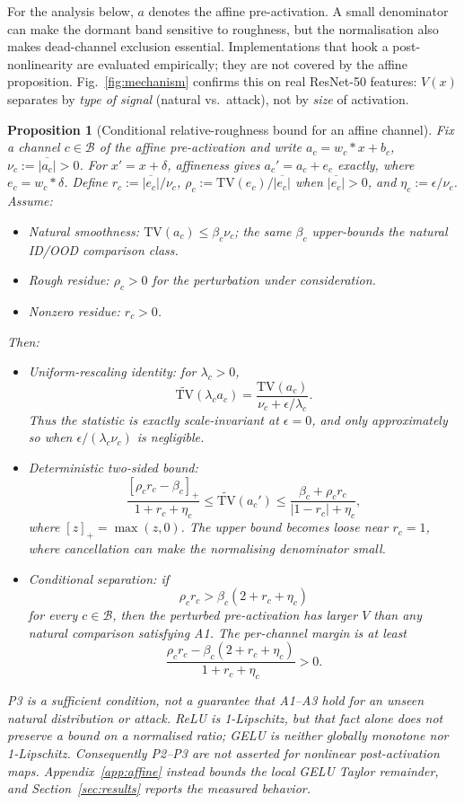 \documentclass[10pt,letterpaper,journal]{IEEEtran}
\newtheorem{proposition}{Proposition}
\newcommand{\rev}[1]{#1}
\begin{document}
For the analysis below, $a$ denotes the affine pre-activation. A small
denominator can make the dormant band sensitive to roughness, but the
normalisation also makes dead-channel exclusion essential. Implementations that
hook a post-nonlinearity are evaluated empirically; they are not covered by the
affine proposition.
\rev{Fig.~\ref{fig:mechanism} confirms this on real ResNet-50 features: $V(x)$
separates by \emph{type of signal} (natural vs.\ attack), not by \emph{size} of
activation.}

\begin{proposition}[Conditional relative-roughness bound for an affine channel]
\label{prop:shape}
Fix a channel $c\in\mathcal B$ of the affine pre-activation and write
$a_c=w_c\!\ast x+b_c$, $\nu_c:=\overline{|a_c|}>0$. For
$x'=x+\delta$, affineness gives $a_c'=a_c+e_c$ exactly, where
$e_c=w_c\!\ast\delta$. Define
$r_c:=\overline{|e_c|}/\nu_c$,
$\rho_c:=\mathrm{TV}(e_c)/\overline{|e_c|}$ when
$\overline{|e_c|}>0$, and $\eta_c:=\epsilon/\nu_c$.
Assume:
\begin{itemize}\setlength\itemsep{1pt}
\item[\textbf{(A1)}] \emph{Natural smoothness:}
  $\mathrm{TV}(a_c)\le\beta_c\nu_c$; the same $\beta_c$ upper-bounds
  the natural ID/OOD comparison class.
\item[\textbf{(A2)}] \emph{Rough residue:} $\rho_c>0$ for the perturbation
  under consideration.
\item[\textbf{(A3)}] \emph{Nonzero residue:} $r_c>0$.
\end{itemize}
Then:
\begin{itemize}\setlength\itemsep{1pt}
\item[\textbf{(P1)}] \emph{Uniform-rescaling identity:} for $\lambda_c>0$,
\[
\widetilde{\mathrm{TV}}(\lambda_c a_c)
=\frac{\mathrm{TV}(a_c)}{\nu_c+\epsilon/\lambda_c}.
\]
Thus the statistic is exactly scale-invariant at $\epsilon=0$, and only
approximately so when $\epsilon/(\lambda_c\nu_c)$ is negligible.
\item[\textbf{(P2)}] \emph{Deterministic two-sided bound:}
\[
\frac{[\rho_c r_c-\beta_c]_+}{1+r_c+\eta_c}
\le \widetilde{\mathrm{TV}}(a_c') \le
\frac{\beta_c+\rho_c r_c}{|1-r_c|+\eta_c},
\]
where $[z]_+=\max(z,0)$. The upper bound becomes loose near $r_c=1$,
where cancellation can make the normalising denominator small.
\item[\textbf{(P3)}] \emph{Conditional separation:} if
\[
\rho_c r_c>\beta_c(2+r_c+\eta_c)
\]
for every $c\in\mathcal B$, then the perturbed pre-activation has larger
$V$ than any natural comparison satisfying A1. The per-channel margin is at
least
\[
\frac{\rho_c r_c-\beta_c(2+r_c+\eta_c)}
     {1+r_c+\eta_c}>0.
\]
\end{itemize}
P3 is a sufficient condition, not a guarantee that A1--A3 hold for an unseen
natural distribution or attack. ReLU is 1-Lipschitz, but that fact alone does
not preserve a bound on a normalised ratio; GELU is neither globally monotone
nor 1-Lipschitz. Consequently P2--P3 are not asserted for nonlinear
post-activation maps. Appendix~\ref{app:affine} instead bounds the local GELU
Taylor remainder, and Section~\ref{sec:results} reports the measured behavior.
\end{proposition}
\end{document}
